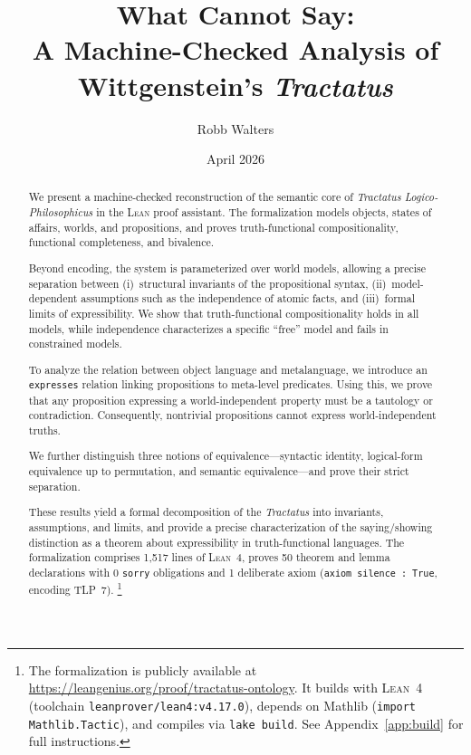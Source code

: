 \documentclass[10pt, letterpaper]{article}
\title{What \Lean{} Cannot Say:\\
A Machine-Checked Analysis of Wittgenstein's \emph{Tractatus}}
\author{Robb Walters}
\date{April 2026}
\theoremstyle{definition}
\theoremstyle{remark}
\newcommand{\Lean}{\textsc{Lean}}
\begin{document}
\maketitle

\begin{abstract}
We present a machine-checked reconstruction of the semantic core
of \emph{Tractatus Logico-Philosophicus} in the \Lean{} proof
assistant.  The formalization models objects, states of affairs,
worlds, and propositions, and proves truth-functional
compositionality, functional completeness, and bivalence.

Beyond encoding, the system is parameterized over world models,
allowing a precise separation between (i)~structural invariants
of the propositional syntax, (ii)~model-dependent assumptions
such as the independence of atomic facts, and (iii)~formal limits
of expressibility.  We show that truth-functional compositionality
holds in all models, while independence characterizes a specific
``free'' model and fails in constrained models.

To analyze the relation between object language and metalanguage,
we introduce an \texttt{expresses} relation linking propositions
to meta-level predicates.  Using this, we prove that any
proposition expressing a world-independent property must be a
tautology or contradiction.  Consequently, nontrivial propositions
cannot express world-independent truths.

We further distinguish three notions of
equivalence---syntactic identity, logical-form equivalence up to
permutation, and semantic equivalence---and prove their strict
separation.

These results yield a formal decomposition of the \emph{Tractatus}
into invariants, assumptions, and limits, and provide a precise
characterization of the saying/showing distinction as a theorem
about expressibility in truth-functional languages.
The formalization comprises 1,517 lines of \Lean~4, proves 50
theorem and lemma declarations with 0 \texttt{sorry} obligations
and 1 deliberate axiom (\texttt{axiom silence : True}, encoding
TLP~7).%
\footnote{The formalization is publicly available at
  \url{https://leangenius.org/proof/tractatus-ontology}.
  It builds with \Lean~4 (toolchain \texttt{leanprover/lean4:v4.17.0}),
  depends on Mathlib (\texttt{import Mathlib.Tactic}), and compiles via
  \texttt{lake build}.  See Appendix~\ref{app:build} for full
  instructions.}
\end{abstract}

\end{document}
